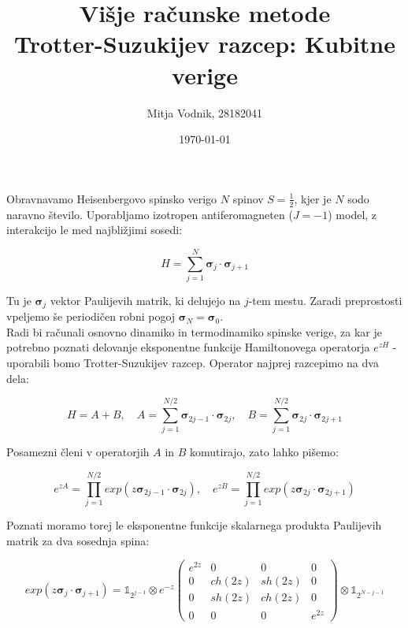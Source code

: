 \documentclass[a4paper]{article}
\newcommand{\half}{\frac{1}{2}}
\newcommand{\pauli}{\mathbf{\sigma}}
\newcommand{\id}[1]{\mathbb{1}_{2^{#1}}}
\begin{document}
    \title{\sc\large Višje računske metode\\
		\bigskip
		\bf\Large Trotter-Suzukijev razcep: Kubitne verige}
	\author{Mitja Vodnik, 28182041}
	\date{\today}
	\maketitle

    Obravnavamo Heisenbergovo spinsko verigo $N$ spinov $S = \half$, kjer je $N$ sodo naravno število. Uporabljamo
    izotropen antiferomagneten ($J = -1$) model, z interakcijo le med najbližjimi sosedi:

    \begin{equation}\label{eq1}
        H = \sum_{j=1}^{N} \pauli_j \cdot \pauli_{j+1}
    \end{equation}

    Tu je $\pauli_j$ vektor Paulijevih matrik, ki delujejo na $j$-tem mestu. Zaradi preprostosti vpeljemo še
    periodičen robni pogoj $\pauli_N = \pauli_0$.\\

    Radi bi računali osnovno dinamiko in
    termodinamiko spinske verige, za kar je potrebno poznati delovanje eksponentne funkcije Hamiltonovega operatorja
    $e^{zH}$ - uporabili bomo Trotter-Suzukijev razcep. Operator najprej razcepimo na dva dela:

    \begin{equation}\label{eq2}
            H = A + B, \quad
            A = \sum_{j=1}^{N/2} \pauli_{2j-1} \cdot \pauli_{2j}, \quad
            B = \sum_{j=1}^{N/2} \pauli_{2j} \cdot \pauli_{2j+1}
    \end{equation}

    Posamezni členi v operatorjih $A$ in $B$ komutirajo, zato lahko pišemo:

    \begin{equation}\label{eq3}
    e^{zA} = \prod_{j=1}^{N/2} exp(z\pauli_{2j-1} \cdot \pauli_{2j}), \quad
    e^{zB} = \prod_{j=1}^{N/2} exp(z\pauli_{2j} \cdot \pauli_{2j+1})
    \end{equation}

    Poznati moramo torej le eksponentne funkcije skalarnega produkta Paulijevih matrik za dva sosednja spina:

    \begin{equation}\label{eq4}
    exp(z\pauli_{j} \cdot \pauli_{j+1}) = \id{j-1} \otimes e^{-z}
        \begin{pmatrix}
            e^{2z} & 0 & 0 & 0 \\
            0 & ch(2z) & sh(2z) & 0 \\
            0 & sh(2z) & ch(2z) & 0 \\
            0 & 0 & 0 & e^{2z}
        \end{pmatrix} \otimes \id{N-j-1}
    \end{equation}
\end{document}
